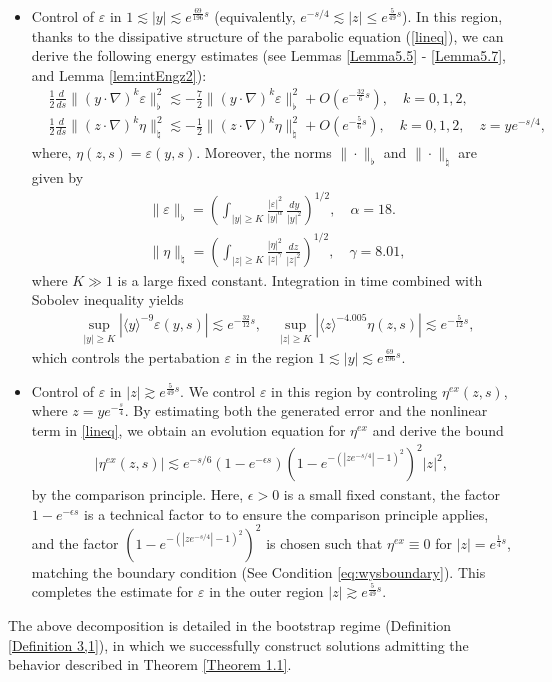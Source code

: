 \documentclass[11pt,reqno]{amsart}
\theoremstyle{definition}
\theoremstyle{bfremark}
\numberwithin{equation}{section}
\begin{document}
\begin{itemize}
\item Control of \(\varepsilon\) in \(1 \lesssim  |y|\lesssim e^{\frac{69}{196}s}\) (equivalently, $e^{-s/4} \lesssim |z| \leq e^{\frac{5}{49}s}$). In this region, thanks to the dissipative structure of the parabolic equation (\ref{lineq}), we can derive the following energy estimates (see Lemmas \ref{Lemma5.5} - \ref{Lemma5.7}, and Lemma \ref{lem:intEngz2}):
\begin{align*}
        &\frac{1}{2}\frac{d}{ds}\|(y \cdot \nabla)^k\varepsilon\|_{\flat}^2 \lesssim-\frac{7}{2}\|(y \cdot \nabla)^k\varepsilon\|^2_{\flat}+O(e^{-\frac{32}{6}s}), \quad k=0,1,2,\\
        &\frac{1}{2}\frac{d}{ds}\|(z \cdot \nabla)^k\eta\|_{\natural}^2 \lesssim-\frac{1}{2}\|(z \cdot \nabla)^k\eta\|^2_{\natural}+O(e^{-\frac{5}{6}s}), \quad k=0,1,2, \quad z=ye^{-s/4},
\end{align*}
where, \(\eta(z,s)=\varepsilon(y,s)\). Moreover, the norms \(\|\cdot\|_{\flat}\) and \(\|\cdot\|_{\natural}\) are given by
\begin{align}
        &\|\varepsilon\|_{\flat}=\left(\int_{|y| \geq K}\frac{|\varepsilon|^2}{|y|^{\alpha}}\,\frac{dy}{|y|^2}\right)^{1/2}, \quad \alpha=18.\\
        &\|\eta\|_{\natural}=\left(\int_{|z| \geq K}\frac{|\eta|^2}{|z|^{\gamma}}\,\frac{dz}{|z|^2}\right)^{1/2}, \quad \gamma=8.01,
\end{align}
where \(K \gg 1\) is a large fixed constant. Integration in time combined with Sobolev inequality yields
\begin{align*}
    &\sup_{|y| \geq K}|\langle y \rangle^{-9} \varepsilon(y,s)| \lesssim e^{-\frac{32}{12}s}, \quad\sup_{|z| \geq K}|\langle z \rangle^{-4.005} \eta(z,s)| \lesssim e^{-\frac{5}{12}s}, 
\end{align*}
which controls the pertabation \(\varepsilon\) in the region \(1 \lesssim  |y|\lesssim e^{\frac{69}{196}s}\).

\item Control of \(\varepsilon\) in \(|z| \gtrsim e^{\frac{5}{49}s}\). We control \(\varepsilon\) in this region by controling \(\eta^{ex}(z,s)\), where \(z=ye^{-\frac{s}{4}}\). By estimating both the generated error and the nonlinear term in \ref{lineq}, we obtain an evolution equation for \(\eta^{ex}\) and derive the bound 
\begin{align*}
    |\eta^{ex}(z,s)| \lesssim e^{-s/6}(1-e^{-\epsilon s})(1-e^{-(|ze^{-s/4}|-1)^2})^2|z|^2,
\end{align*}
by the comparison principle. Here, \(\epsilon>0\) is a small fixed constant, the factor \(1-e^{-\epsilon s}\) is a technical factor to to ensure the comparison principle applies, and the factor \((1-e^{-(|ze^{-s/4}|-1)^2})^2\) is chosen such that \(\eta^{ex} \equiv 0\) for \(|z|=e^{\frac{1}{4}s}\), matching the boundary condition (See Condition \ref{eq:wysboundary}). This completes the estimate for \(\varepsilon\) in the outer region \(|z| \gtrsim e^{\frac{5}{49}s}\).
\end{itemize}
The above decomposition is detailed in the bootstrap regime (Definition \ref{Definition 3,1}), in which we successfully construct solutions admitting the behavior described in Theorem \ref{Theorem 1.1}.
\end{document}
